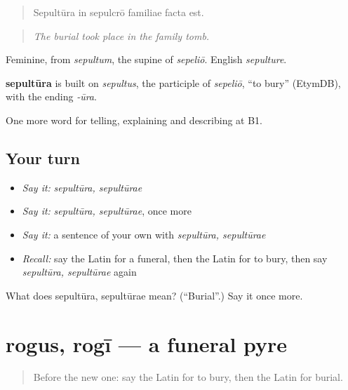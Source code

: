 \begin{quote}
Sepultūra in sepulcrō familiae facta est.
\end{quote}

\begin{quote}
\emph{The burial took place in the family tomb.}
\end{quote}

Feminine, from \emph{sepultum}, the supine of \emph{sepeliō}. English \emph{sepulture}.

\begin{cousinweb}
\textbf{sepultūra} is built on \emph{sepultus}, the participle of \emph{sepeliō}, \textquotedblleft{}to bury\textquotedblright{} (EtymDB), with the ending \emph{-ūra}.
\end{cousinweb}

\begin{grammarlens}[title={What you've built}]
One more word for telling, explaining and describing at B1.
\end{grammarlens}

\subsection*{Your turn}
\begin{itemize}
\raggedright
  \item \emph{Say it:} \emph{sepultūra, sepultūrae}
  \item \emph{Say it:} \emph{sepultūra, sepultūrae}, once more
  \item \emph{Say it:} a sentence of your own with \emph{sepultūra, sepultūrae}
  \item \emph{Recall:} say the Latin for a funeral, then the Latin for to bury, then say \emph{sepultūra, sepultūrae} again
\end{itemize}

\begin{tcolorbox}[breakable,colback=teal!4,colframe=teal!35!black,title={Before you move on}]
What does sepultūra, sepultūrae mean? (\textquotedblleft{}Burial\textquotedblright{}.) Say it once more.
\end{tcolorbox}
\section[rogus, rogī]{rogus, rogī — a funeral pyre}

\label{lesson:LA-C330-rogus}



\begin{quote}
Before the new one: say the Latin for to bury, then the Latin for burial.
\end{quote}

